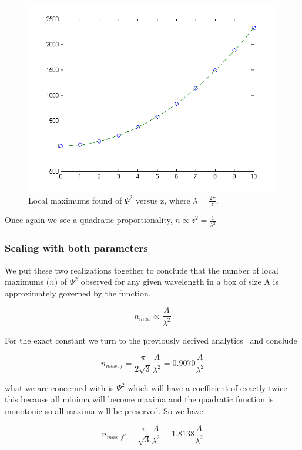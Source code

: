 \documentclass[12pt]{article}
\begin{document}
\begin{figure}[ht]
	\centering
		\includegraphics[width=1.00\textwidth]{wlscaleSquares.png}
	\caption{Local maximums found of $\Psi^{2}$ versus z, where $\lambda = \frac{2 \pi}{z}$.}
	\label{fig:wlscaleSquares}
\end{figure}

\pagebreak

Once again we see a quadratic proportionality, $n \propto z^{2} = \frac{1}{\lambda^{2}}$

\subsubsection{Scaling with both parameters}

We put these two realizations together to conclude that the number of local maximums ($n$) of $\Psi^{2}$ observed for any given wavelength in a box of size A is approximately governed by the function,

\[n_{max} \propto \frac{A}{\lambda^{2}}\]

For the exact constant we turn to the previously derived analytics~\cite{LH21} and conclude

\[n_{max,f} = \frac{\pi}{2 \sqrt{3}} \frac{A}{\lambda^{2}} = 0.9070 \frac{A}{\lambda^{2}}\]

what we are concerned with is $\Psi^{2}$ which will have a coefficient of exactly twice this because all minima will become maxima and the quadratic function is monotonic so all maxima will be preserved. So we have

\[n_{max,f^{2}} = \frac{\pi}{\sqrt{3}} \frac{A}{\lambda^{2}} = 1.8138 \frac{A}{\lambda^{2}}\]
\end{document}
